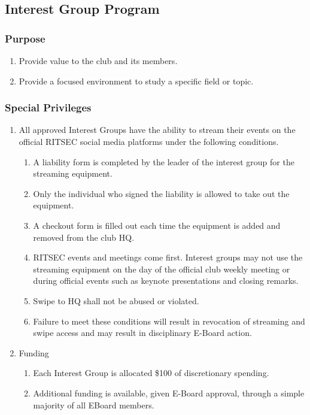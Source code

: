 \subsection{Interest Group Program}

\subsubsection{Purpose}

\begin{enumerate}
  \item Provide value to the club and its members.
  \item Provide a focused environment to study a specific field or topic.
\end{enumerate}

\subsubsection{Special Privileges}

\begin{enumerate}
  \item All approved Interest Groups have the ability to stream their events on
    the official RITSEC social media platforms under the following conditions.
  \begin{enumerate}
    \item A liability form is completed by the leader of the interest group for
      the streaming equipment.
    \item Only the individual who signed the liability is allowed to take out
      the equipment.
    \item A checkout form is filled out each time the equipment is added and
      removed from the club HQ.
    \item RITSEC events and meetings come first. Interest groups may not use
      the streaming equipment on the day of the official club weekly meeting or
      during official events such as keynote presentations and closing remarks.
    \item Swipe to HQ shall not be abused or violated.
    \item Failure to meet these conditions will result in revocation of
      streaming and swipe access and may result in disciplinary E-Board action.
  \end{enumerate}
  \item Funding
  \begin{enumerate}
    \item Each Interest Group is allocated \$100 of discretionary spending.
    \item Additional funding is available, given E-Board approval, through a
      simple majority of all EBoard members. 
  \end{enumerate}
\end{enumerate}


